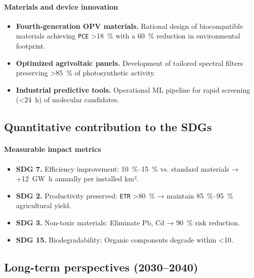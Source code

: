\documentclass[12pt, a4paper]{article}
\begin{document}
\paragraph{Materials and device innovation}
\begin{itemize}
    \item \textbf{Fourth-generation OPV materials.} Rational design of biocompatible materials achieving \texttt{PCE} \SI{>18}{\percent} with a \SI{60}{\percent} reduction in environmental footprint.
    
    \item \textbf{Optimized agrivoltaic panels.} Development of tailored spectral filters preserving \SI{>85}{\percent} of photosynthetic activity.
    
    \item \textbf{Industrial predictive tools.} Operational ML pipeline for rapid screening (\SI{<24}{\hour}) of molecular candidates.
\end{itemize}

\subsection{Quantitative contribution to the SDGs}

\paragraph{Measurable impact metrics}
\begin{itemize}
    \item \textbf{SDG 7.} Efficiency improvement: \SIrange{+10}{+15}{\percent} vs. standard materials → +\SI{12}{\giga\watt\hour} annually per installed km².
    \item \textbf{SDG 2.} Productivity preserved: \texttt{ETR} \SI{>80}{\percent} → maintain \SIrange{85}{95}{\percent} agricultural yield.
    \item \textbf{SDG 3.} Non-toxic materials: Eliminate Pb, Cd → \SI{90}{\percent} risk reduction.
    \item \textbf{SDG 15.} Biodegradability: Organic components degrade within \SI{<10}{\year}.
\end{itemize}

\subsection{Long-term perspectives (2030–2040)}
\end{document}
